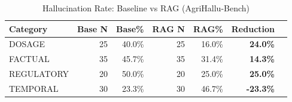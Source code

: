 \begin{table}[h]
\centering
\caption{Hallucination Rate: Baseline vs RAG (AgriHallu-Bench)}
\label{tab:main_results}
\begin{tabular}{lrrrrrr}
\hline
Category & Base N & Base\% & RAG N & RAG\% & Reduction \\ \hline
DOSAGE & 25 & 40.0\% & 25 & 16.0\% & \textbf{24.0\%} \\
FACTUAL & 35 & 45.7\% & 35 & 31.4\% & \textbf{14.3\%} \\
REGULATORY & 20 & 50.0\% & 20 & 25.0\% & \textbf{25.0\%} \\
TEMPORAL & 30 & 23.3\% & 30 & 46.7\% & \textbf{-23.3\%} \\
\hline
\end{tabular}
\end{table}